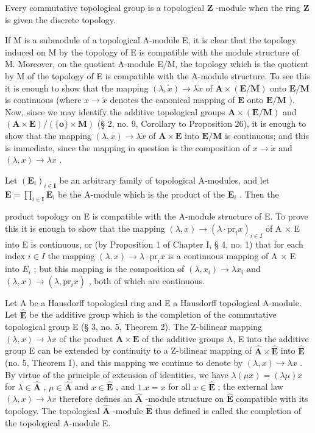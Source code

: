 Every commutative topological group is a topological \(\mathbf{Z}\) -module when the ring \(\mathbf{Z}\) is given the discrete topology.

If M is a submodule of a topological A-module E, it is clear that the topology induced on M by the topology of E is compatible with the module structure of M. Moreover, on the quotient A-module E/M, the topology which is the quotient by M of the topology of E is compatible with the A-module structure. To see this it is enough to show that the mapping \((\lambda, \dot{x}) \to \lambda \dot{x}\) of \(\mathbf{A} \times (\mathbf{E} / \mathbf{M})\) onto \(\mathbf{E} / \mathbf{M}\) is continuous (where \(x \to \dot{x}\) denotes the canonical mapping of \(\mathbf{E}\) onto \(\mathbf{E} / \mathbf{M}\) ). Now, since we may identify the additive topological groups \(\mathbf{A} \times (\mathbf{E} / \mathbf{M})\) and \((\mathbf{A} \times \mathbf{E}) / (\{\mathbf{o}\} \times \mathbf{M})\) (§ 2, no. 9, Corollary to Proposition 26), it is enough to show that the mapping \((\lambda, x) \to \lambda \dot{x}\) of \(\mathbf{A} \times \mathbf{E}\) into \(\mathbf{E} / \mathbf{M}\) is continuous; and this is immediate, since the mapping in question is the composition of \(x \to \dot{x}\) and \((\lambda, x) \to \lambda x\) .

Let \((\mathbf{E}_i)_{i\in \mathbf{I}}\) be an arbitrary family of topological A-modules, and let \(\mathbf{E} = \prod_{i\in \mathbf{I}}\mathbf{E}_i\) be the A-module which is the product of the \(\mathbf{E}_i\) . Then the

product topology on E is compatible with the A-module structure of E. To prove this it is enough to show that the mapping \((\lambda, x) \to (\lambda \cdot \text{pr}_i x)_{i \in I}\) of A × E into E is continuous, or (by Proposition 1 of Chapter I, § 4, no. 1) that for each index \(i \in I\) the mapping \((\lambda, x) \to \lambda \cdot \text{pr}_i x\) is a continuous mapping of A × E into \(E_i\) ; but this mapping is the composition of \((\lambda, x_i) \to \lambda x_i\) and \((\lambda, x) \to (\lambda, \text{pr}_i x)\) , both of which are continuous.

Let A be a Hausdorff topological ring and E a Hausdorff topological A-module. Let \(\hat{\mathbf{E}}\) be the additive group which is the completion of the commutative topological group E (§ 3, no. 5, Theorem 2). The Z-bilinear mapping \((\lambda, x) \to \lambda x\) of the product \(\mathbf{A} \times \mathbf{E}\) of the additive groups A, E into the additive group E can be extended by continuity to a Z-bilinear mapping of \(\hat{\mathbf{A}} \times \hat{\mathbf{E}}\) into \(\hat{\mathbf{E}}\) (no. 5, Theorem 1), and this mapping we continue to denote by \((\lambda, x) \to \lambda x\) . By virtue of the principle of extension of identities, we have \(\lambda(\mu x) = (\lambda \mu)x\) for \(\lambda \in \hat{\mathbf{A}}\) , \(\mu \in \hat{\mathbf{A}}\) and \(x \in \hat{\mathbf{E}}\) , and \(1.x = x\) for all \(x \in \hat{\mathbf{E}}\) ; the external law \((\lambda, x) \to \lambda x\) therefore defines an \(\hat{\mathbf{A}}\) -module structure on \(\hat{\mathbf{E}}\) compatible with its topology. The topological \(\hat{\mathbf{A}}\) -module \(\hat{\mathbf{E}}\) thus defined is called the completion of the topological A-module E.

